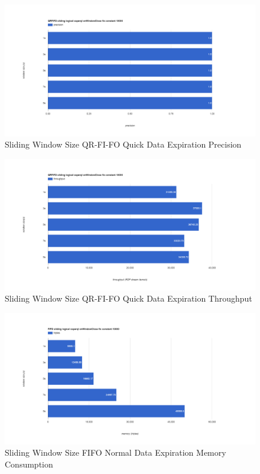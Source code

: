 \begin{figure}[!htbp]
    \centering
    \includegraphics[width=\textwidth]{img/app3-slide-ws-qrfifo-quick-p.png}
    \caption{Sliding Window Size QR-FI-FO Quick Data Expiration Precision}
\end{figure}
\begin{figure}[!htbp]
    \centering
    \includegraphics[width=\textwidth]{img/app3-slide-ws-qrfifo-quick-t.png}
    \caption{Sliding Window Size QR-FI-FO Quick Data Expiration Throughput}
\end{figure}
\begin{figure}[!htbp]
    \centering
    \includegraphics[width=\textwidth]{img/app3-slide-ws-fifo-normal-m.png}
    \caption{Sliding Window Size FIFO Normal Data Expiration Memory Consumption}
\end{figure}
